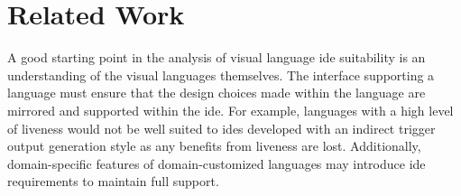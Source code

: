 \section{Related Work} \label{sec:relatedwork}

A good starting point in the analysis of visual language \ac{ide}
suitability is an understanding of the visual languages themselves. The
interface supporting a language must ensure that the design choices made
within the language are mirrored and supported within the \ac{ide}.
\cite{hils1992} For example, languages with a high level of liveness
\cite{hils1992} would not be well suited to \acp{ide} developed with an
indirect trigger output generation style as any benefits from liveness are
lost. Additionally, domain-specific features of domain-customized languages
may introduce \ac{ide} requirements to maintain full support.
